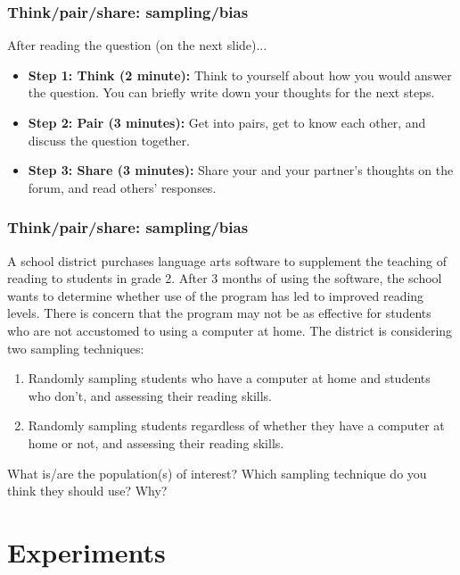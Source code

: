 \documentclass[slidestop,compress,mathserif]{beamer}
\begin{document}

\begin{frame}
	\frametitle{Think/pair/share: sampling/bias}

	After reading the question (on the next slide)...

	\begin{itemize}
		\item \textbf{Step 1: Think (2 minute):} Think to yourself about how you would answer the question. You can briefly write down your thoughts for the next steps.
		\item \textbf{Step 2: Pair (3 minutes):} Get into pairs, get to know each other, and discuss the question together. 
		\item \textbf{Step 3: Share (3 minutes):} Share your and your partner's thoughts on the forum, and read others' responses.
	\end{itemize}
\end{frame}

\begin{frame}
	\frametitle{Think/pair/share: sampling/bias}

	A school district purchases language arts software to supplement the teaching of reading to students in grade 2. 
	After 3 months of using the software, the school wants to determine whether use of the program has led to improved reading levels. 
	There is concern that the program may not be as effective for students who are not accustomed to using a computer at home. 
	The district is considering two sampling techniques:

	\begin{enumerate}
		\item Randomly sampling students who have a computer at home and students who don't, and assessing their reading skills. 
		\item Randomly sampling students regardless of whether they have a computer at home or not, and assessing their reading skills. 
	\end{enumerate}

	What is/are the population(s) of interest? Which sampling technique do you think they should use? Why?
\end{frame}


\section{Experiments}
\end{document}
